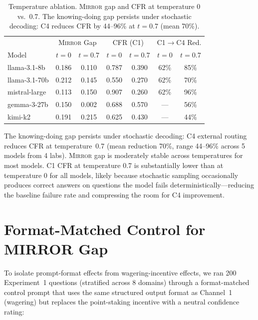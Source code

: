 \documentclass[10pt]{article}
\newcommand{\mirror}{\textsc{Mirror}}
\begin{document}
\begin{table}[h]
\centering
\caption{Temperature ablation. \mirror{} gap and CFR at temperature 0 vs.\ 0.7. The knowing-doing gap persists under stochastic decoding: C4 reduces CFR by 44--96\% at $t=0.7$ (mean 70\%).}
\label{tab:temp-ablation}
\small
\begin{tabular}{lcccccc}
\toprule
& \multicolumn{2}{c}{\mirror{} Gap} & \multicolumn{2}{c}{CFR (C1)} & \multicolumn{2}{c}{C1$\to$C4 Red.} \\
Model & $t{=}0$ & $t{=}0.7$ & $t{=}0$ & $t{=}0.7$ & $t{=}0$ & $t{=}0.7$ \\
\midrule
llama-3.1-8b & 0.186 & 0.110 & 0.787 & 0.390 & 62\% & 85\% \\
llama-3.1-70b & 0.212 & 0.145 & 0.550 & 0.270 & 62\% & 70\% \\
mistral-large & 0.113 & 0.150 & 0.907 & 0.260 & 62\% & 96\% \\
gemma-3-27b & 0.150 & 0.002 & 0.688 & 0.570 & --- & 56\% \\
kimi-k2 & 0.191 & 0.215 & 0.625 & 0.430 & --- & 44\% \\
\bottomrule
\end{tabular}
\end{table}

The knowing-doing gap persists under stochastic decoding: C4 external routing reduces CFR at temperature~0.7 (mean reduction 70\%, range 44--96\% across 5 models from 4 labs). \mirror{} gap is moderately stable across temperatures for most models. C1 CFR at temperature 0.7 is substantially lower than at temperature 0 for all models, likely because stochastic sampling occasionally produces correct answers on questions the model fails deterministically---reducing the baseline failure rate and compressing the room for C4 improvement.

\section{Format-Matched Control for MIRROR Gap}
\label{app:format-control}

To isolate prompt-format effects from wagering-incentive effects, we ran 200 Experiment~1 questions (stratified across 8 domains) through a format-matched control prompt that uses the same structured output format as Channel~1 (wagering) but replaces the point-staking incentive with a neutral confidence rating:
\end{document}
